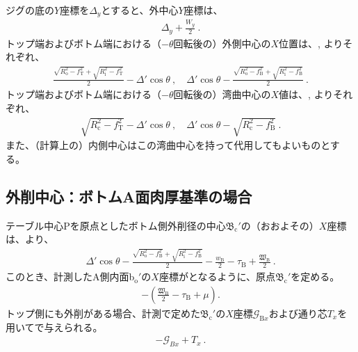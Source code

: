 \clearpage
ジグの底の$Y$座標を$\varDelta_y$とすると、外中心$Y$座標は、
\begin{align*}
  \varDelta_y+\frac{W_y}2\ .
\end{align*}
トップ端およびボトム端における（$-\theta$回転後の）外側中心の$X$位置は、, よりそれぞれ、
\begin{align*}
  \frac{\sqrt{R_\mathrm o^2-f_\mathrm T^2}+\sqrt{R_\mathrm i^2-f_\mathrm T^2}}2-\varDelta'\cos\theta~, \quad
  \varDelta'\cos\theta-\frac{\sqrt{R_\mathrm o^2-f_\mathrm B^2}+\sqrt{R_\mathrm i^2-f_\mathrm B^2}}2\ .
\end{align*}
トップ端およびボトム端における（$-\theta$回転後の）湾曲中心の$X$値は、, よりそれぞれ、
\begin{align*}
  \sqrt{R_\mathrm c^2-f_\mathrm T^2}-\varDelta'\!\cos\theta~, \quad
  \varDelta'\!\cos\theta-\sqrt{R_\mathrm c^2-f_\mathrm B^2}~.
\end{align*}
また、（計算上の）内側中心はこの湾曲中心を持って代用してもよいものとする。



\clearpage


\subsection{外削中心：ボトムA面肉厚基準の場合}
テーブル中心Pを原点としたボトム側外削径の中心$\mathfrak B_\mathrm c'$の（おおよその）$X$座標は、より、
\begin{align*}
  \varDelta'\cos\theta-\frac{\sqrt{R_\mathrm o^2-f_\mathrm B^2}+\sqrt{R_\mathrm i^2-f_\mathrm B^2}}2
  -\frac{w_\mathrm B}2-\tau_\mathrm B+\frac{\mathfrak W_\mathrm B}2\ .
\end{align*}
このとき、計測したA側内面b$_\mathrm o'$の$X$座標がとなるように、原点$\mathfrak B_\mathrm c'$を定める。
\begin{align*}
  -\left(\frac{\mathfrak W_\mathrm B}2-\tau_\mathrm B+\mu\right).
\end{align*}
トップ側にも外削がある場合、計測で定めた$\mathfrak B_\mathrm c'$の$X$座標$\mathcal G_{\mathrm Bx}$および通り芯$T_x$を用いてで与えられる。
\begin{align*}
  -\mathcal G_{Bx}+T_x\ .
\end{align*}


